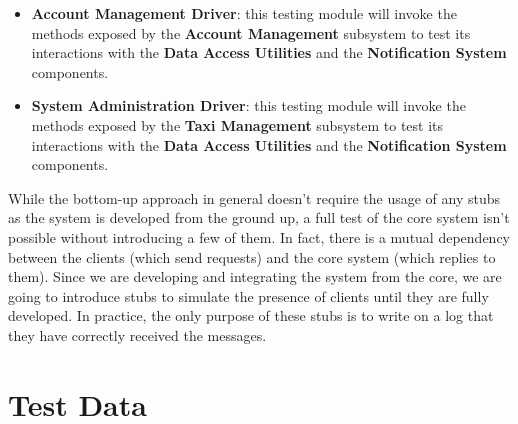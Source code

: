 \begin{itemize}
	\item \textbf{Account Management Driver}: this testing module will invoke the methods exposed by the \textbf{Account Management} subsystem to test its interactions with the \textbf{Data Access Utilities} and the \textbf{Notification System} components. 
	\item \textbf{System Administration Driver}: this testing module will invoke the methods exposed by the \textbf{Taxi Management} subsystem to test its interactions with the \textbf{Data Access Utilities} and the \textbf{Notification System} components. 
\end{itemize}


While the bottom-up approach in general doesn't require the usage of any stubs as the system is developed from the ground up, a full test of the core system isn't possible without introducing a few of them. In fact, there is a mutual dependency between the clients (which send requests) and the core system (which replies to them). Since we are developing and integrating the system from the core, we are going to introduce stubs to simulate the presence of clients until they are fully developed. In practice, the only purpose of these stubs is to write on a log that they have correctly received the messages.


\section{Test Data}